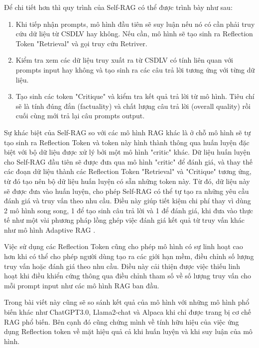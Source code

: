 \documentclass{article}
\begin{document}
Để chi tiết hơn thì quy trình của Self-RAG có thể được trình bày như sau: 

\begin{enumerate}
    \item Khi tiếp nhận prompts, mô hình đầu tiên sẽ suy luận nếu nó có cần phải truy cứu dữ liệu từ CSDLV hay không. Nếu cần, mô hình sẽ tạo sinh ra Reflection Token "Retrieval" và gọi truy cứu Retriver. 
    \item Kiểm tra xem các dữ liệu truy xuất ra từ CSDLV có tính liên quan với prompts input hay không và tạo sinh ra các câu trả lời tương ứng với từng dữ liệu. 
    \item Tạo sinh các token "Critique" và kiểm tra kết quả trả lời từ mô hình. Tiêu chí sẽ là tính đúng đắn (factuality) và chất lượng câu trả lời (overall quality) rồi cuối cùng mới trả lại câu prompts output.  
\end{enumerate}

Sự khác biệt của Self-RAG so với các mô hình RAG khác là ở chỗ mô hình sẽ tự tạo sinh ra Reflection Token và token này hình thành thông qua huấn luyện đặc biệt với bộ dữ liệu được xử lý bởi một mô hình "critic" khác. Dữ liệu huấn luyện cho Self-RAG đầu tiên sẽ được đưa qua mô hình "critic" để đánh giá, và thay thế các đoạn dữ liệu thành các Reflection Token "Retrieval" và "Critique" tương ứng, từ đó tạo nên bộ dữ liệu huấn luyện có sẵn những token này. Từ đó, dữ liệu này sẽ được đưa vào huấn luyện, cho phép Self-RAG có thể tự tạo ra những yêu cầu đánh giá và truy vấn theo nhu cầu. Điều này giúp tiết kiệm chi phí thay vì dùng 2 mô hình song song, 1 để tạo sinh câu trả lời và 1 để đánh giá, khi đưa vào thực tế như một vài phương pháp lồng ghép việc đánh giá kết quả từ truy vấn khác như mô hình Adaptive RAG \cite{jeong2024adaptive}. 

Việc sử dụng các Reflection Token cũng cho phép mô hình có sự linh hoạt cao hơn khi có thể cho phép người dùng tạo ra các giới hạn mềm, điều chỉnh số lượng truy vấn hoặc đánh giá theo nhu cầu. Điều này cải thiện được việc thiếu linh hoạt khi điều khiển cứng thông qua điều chỉnh tham số về số lượng truy vấn cho mỗi prompt input như các mô hình RAG ban đầu. 

Trong bài viết này cũng sẽ so sánh kết quả của mô hình với những mô hình phổ biến khác như ChatGPT3.0, Llama2-chat và Alpaca khi chỉ được trang bị cơ chế RAG phổ biến. Bên cạnh đó cũng chứng mình về tính hữu hiệu của việc ứng dụng Reflection token về mặt hiệu quả cả khi huấn luyện và khi suy luận của mô hình.  
\end{document}
